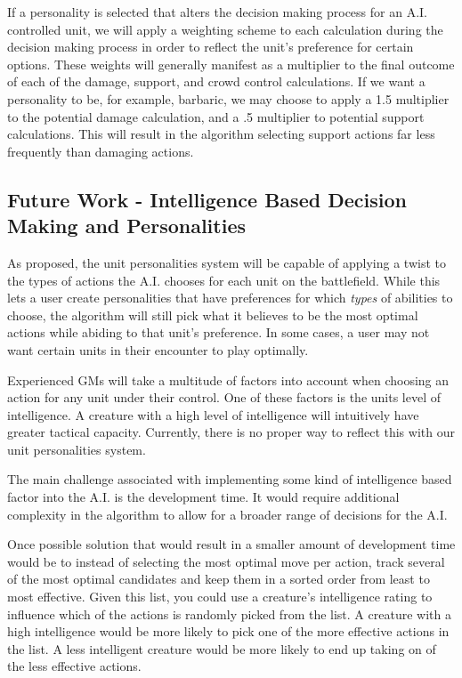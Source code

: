 \documentclass[12pt,a4paper]{report}
\begin{document}
		If a personality is selected that alters the decision making process for an A.I. controlled unit, we will apply a weighting scheme to each calculation during the decision making process in order to reflect the unit's preference for certain options. These weights will generally manifest as a multiplier to the final outcome of each of the damage, support, and crowd control calculations. If we want a personality to be, for example, barbaric, we may choose to apply a 1.5 multiplier to the potential damage calculation, and a .5 multiplier to potential support calculations. This will result in the algorithm selecting support actions far less frequently than damaging actions. 
		
		
		\subsection{Future Work - Intelligence Based Decision Making and Personalities}
		As proposed, the unit personalities system will be capable of applying a twist to the types of actions the A.I. chooses for each unit on the battlefield. While this lets a user create personalities that have preferences for which \textit{types} of abilities to choose, the algorithm will still pick what it believes to be the most optimal actions while abiding to that unit's preference. In some cases, a user may not want certain units in their encounter to play optimally. 
		
		Experienced GMs will take a multitude of factors into account when choosing an action for any unit under their control. One of these factors is the units level of intelligence. A creature with a high level of intelligence will intuitively have greater tactical capacity. Currently, there is no proper way to reflect this with our unit personalities system. 
		
		The main challenge associated with implementing some kind of intelligence based factor into the A.I. is the development time. It would require additional complexity in the algorithm to allow for a broader range of decisions for the A.I. 
		
		Once possible solution that would result in a smaller amount of development time would be to instead of selecting the most optimal move per action, track several of the most optimal candidates and keep them in a sorted order from least to most effective. Given this list, you could use a creature's intelligence rating to influence which of the actions is randomly picked from the list. A creature with a high intelligence would be more likely to pick one of the more effective actions in the list. A less intelligent creature would be more likely to end up taking on of the less effective actions.
		
\end{document}
